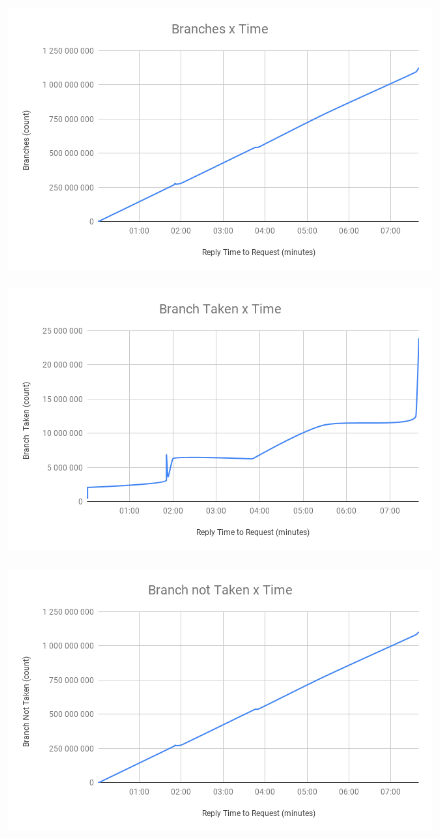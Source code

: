 \documentclass[times, 10pt,twocolumn]{article}
\begin{document}
\begin{figure}[!htb]
   \centering
   \includegraphics[width=\columnwidth]{images/Branches.png}
   \caption{}
\end{figure}
\begin{figure}[!htb]
   \centering
   \includegraphics[width=\columnwidth]{images/Taken.png}
   \caption{}
\end{figure}
\begin{figure}[!htb]
   \centering
   \includegraphics[width=\columnwidth]{images/NotTaken.png}
   \caption{}
\end{figure}
\end{document}
